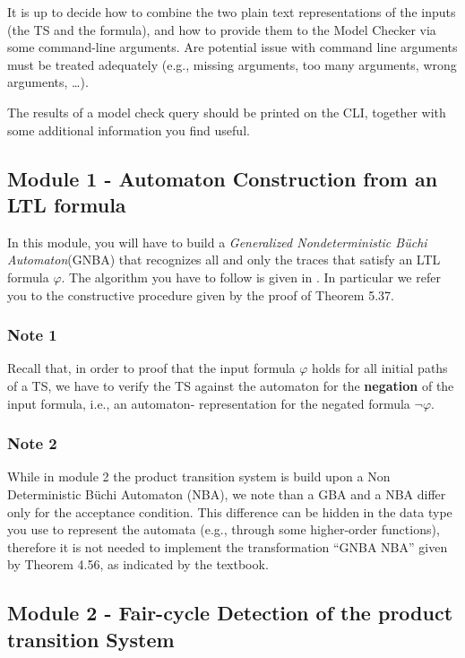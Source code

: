 \documentclass{article}
\begin{document}
It is up to decide how to combine the two plain text representations of the inputs (the TS and the formula), 
and how to provide them to the Model Checker via some command-line arguments. Are potential issue with 
command line arguments must be treated adequately (e.g., missing arguments, too many arguments, wrong arguments, \dots).

The results of a model check query should be printed on the CLI, together with some additional 
information you find useful.

\subsection{Module 1 - Automaton Construction from an LTL formula}
In this module, you will have to build a \emph{Generalized Nondeterministic Büchi Automaton}(GNBA) 
that recognizes all and only the traces that satisfy an LTL formula $\varphi$. The algorithm you have to follow 
is given in \cite[subsubsection* 5.2]{BaKa}. 
In particular we refer you to the constructive procedure given by the proof of Theorem 5.37.


\subsubsection*{Note 1}
Recall that, in order to proof that the input formula $\varphi$ holds for all initial paths of a TS, we have 
to verify the TS against the automaton for the \textbf{negation} of the input formula, i.e., an automaton-
representation for the negated formula $\neg \varphi$.

\subsubsection*{Note 2}
While in module 2 the product transition system is build upon a Non Deterministic Büchi Automaton (NBA), we note 
than a GBA and a NBA differ only for the acceptance condition. This difference can be hidden in the 
data type you use to represent the automata (e.g., through some higher-order functions), 
therefore it is not needed to implement the transformation ``GNBA \leadsto NBA'' given by Theorem 4.56, as indicated 
by the textbook.

\subsection{Module 2 - Fair-cycle Detection of the product transition System}
\end{document}
